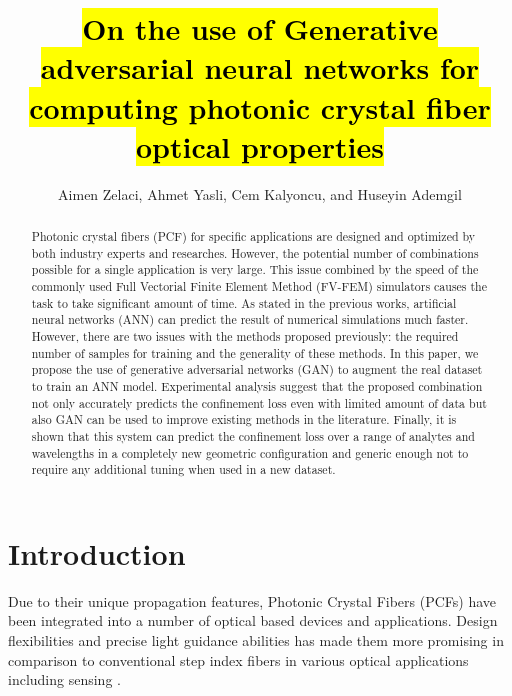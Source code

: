 \documentclass[10pt]{IEEEtran}
\begin{document}
\title{\hl{On the use of Generative adversarial neural networks for computing photonic crystal fiber optical properties}}

\author{Aimen Zelaci, Ahmet Yasli, Cem Kalyoncu, and Huseyin Ademgil}

\maketitle
	
\begin{abstract}
Photonic crystal fibers (PCF) for specific applications are designed and optimized by both industry experts and researches. However, the potential number of combinations possible for a single application is very large. This issue combined by the speed of the commonly used Full Vectorial Finite Element Method (FV-FEM) simulators causes the task to take significant amount of time. As stated in the previous works, artificial neural networks (ANN) can predict the result of numerical simulations much faster. However, there are two issues with the methods proposed previously: the required number of samples for training and the generality of these methods. In this paper, we  propose the use of generative adversarial networks (GAN) to augment the real dataset to train an ANN model. Experimental analysis suggest that the proposed combination not only accurately predicts the confinement loss even with limited amount of data but also GAN can be used to improve existing methods in the literature. Finally, it is shown that this system can predict the confinement loss over a range of analytes and wavelengths in a completely new geometric configuration and generic enough not to require any additional tuning when used in a new dataset.
\end{abstract}

\section{Introduction}

Due to their unique propagation features, Photonic Crystal Fibers (PCFs) have been integrated into a number of optical based devices and applications. Design flexibilities and precise light guidance abilities has made them more promising in comparison to conventional step index fibers in various optical applications including sensing \cite{wang2011selectively}. 
\end{document}
